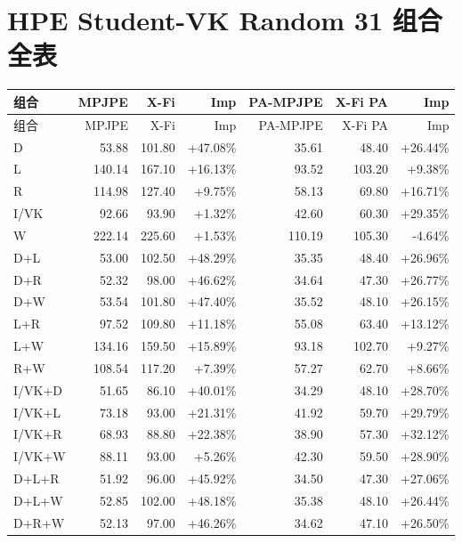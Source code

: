 \documentclass[UTF8,10pt]{ctexart}
\newcommand{\better}[1]{\textcolor{goodblue}{#1}}
\newcommand{\worse}[1]{\textcolor{badred}{#1}}
\begin{document}
\section{HPE Student-VK Random 31 组合全表}
{\tiny
\begin{longtable}{lrrrrrr}
\toprule
组合 & MPJPE & X-Fi & Imp & PA-MPJPE & X-Fi PA & Imp\\
\midrule
\endfirsthead
\toprule
组合 & MPJPE & X-Fi & Imp & PA-MPJPE & X-Fi PA & Imp\\
\midrule
\endhead
D & 53.88 & 101.80 & \better{+47.08\%} & 35.61 & 48.40 & \better{+26.44\%}\\
L & 140.14 & 167.10 & \better{+16.13\%} & 93.52 & 103.20 & \better{+9.38\%}\\
R & 114.98 & 127.40 & \better{+9.75\%} & 58.13 & 69.80 & \better{+16.71\%}\\
I/VK & 92.66 & 93.90 & \better{+1.32\%} & 42.60 & 60.30 & \better{+29.35\%}\\
W & 222.14 & 225.60 & \better{+1.53\%} & 110.19 & 105.30 & \worse{-4.64\%}\\
D+L & 53.00 & 102.50 & \better{+48.29\%} & 35.35 & 48.40 & \better{+26.96\%}\\
D+R & 52.32 & 98.00 & \better{+46.62\%} & 34.64 & 47.30 & \better{+26.77\%}\\
D+W & 53.54 & 101.80 & \better{+47.40\%} & 35.52 & 48.10 & \better{+26.15\%}\\
L+R & 97.52 & 109.80 & \better{+11.18\%} & 55.08 & 63.40 & \better{+13.12\%}\\
L+W & 134.16 & 159.50 & \better{+15.89\%} & 93.18 & 102.70 & \better{+9.27\%}\\
R+W & 108.54 & 117.20 & \better{+7.39\%} & 57.27 & 62.70 & \better{+8.66\%}\\
I/VK+D & 51.65 & 86.10 & \better{+40.01\%} & 34.29 & 48.10 & \better{+28.70\%}\\
I/VK+L & 73.18 & 93.00 & \better{+21.31\%} & 41.92 & 59.70 & \better{+29.79\%}\\
I/VK+R & 68.93 & 88.80 & \better{+22.38\%} & 38.90 & 57.30 & \better{+32.12\%}\\
I/VK+W & 88.11 & 93.00 & \better{+5.26\%} & 42.30 & 59.50 & \better{+28.90\%}\\
D+L+R & 51.92 & 96.00 & \better{+45.92\%} & 34.50 & 47.30 & \better{+27.06\%}\\
D+L+W & 52.85 & 102.00 & \better{+48.18\%} & 35.38 & 48.10 & \better{+26.44\%}\\
D+R+W & 52.13 & 97.00 & \better{+46.26\%} & 34.62 & 47.10 & \better{+26.50\%}\\

\end{longtable}}
\end{document}
